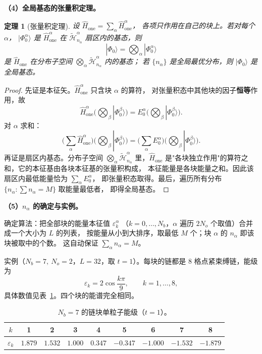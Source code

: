 \documentclass[11pt]{ctexart}
\newtheorem{thm}{定理}[section]
\begin{document}
\textbf{（4）全局基态的张量积定理。}

\begin{thm}[张量积定理]
设 $\hat H_{\mathrm{one}}=\sum_\alpha\hat H_{\mathrm{one}}^{\alpha}$，
各项只作用在自己的块上。若对每个 $\alpha$，
$|\Phi_0^{\alpha}\rangle$ 是 $\hat H_{\mathrm{one}}^{\alpha}$ 在
$\tilde{\mathcal{H}}_{n_\alpha}^\alpha$ 扇区内的基态，则
\[
|\Phi_0\rangle=\bigotimes_\alpha|\Phi_0^{\alpha}\rangle
\]
是 $\hat H_{\mathrm{one}}$ 在分布子空间
$\bigotimes_\alpha\tilde{\mathcal{H}}_{n_\alpha}^\alpha$ 内的基态；
若 $\{n_\alpha\}$ 是全局最优分布，则 $|\Phi_0\rangle$ 是全局基态。
\end{thm}

\begin{proof}
先证是本征矢。$\hat H_{\mathrm{one}}^{\alpha}$ 只含块 $\alpha$ 的算符，
对张量积态中其他块的因子\textbf{恒等}作用，故
\[
\hat H_{\mathrm{one}}^{\alpha}\Big(\bigotimes_\beta|\Phi_0^{\beta}\rangle\Big)
=
E_0^{\alpha}\Big(\bigotimes_\beta|\Phi_0^{\beta}\rangle\Big).
\]
对 $\alpha$ 求和：
\[
\Big(\sum_\alpha\hat H_{\mathrm{one}}^{\alpha}\Big)
\Big(\bigotimes_\beta|\Phi_0^{\beta}\rangle\Big)
=
\Big(\sum_\alpha E_0^{\alpha}\Big)
\Big(\bigotimes_\beta|\Phi_0^{\beta}\rangle\Big).
\]
再证是扇区内基态。分布子空间 $\bigotimes_\alpha\tilde{\mathcal{H}}_{n_\alpha}^\alpha$
里，$\hat H_{\mathrm{one}}$ 是"各块独立作用"的算符之和，它的本征基由各块本征基的张量积构成，
本征能量是各块能量之和。因此该扇区内最低能量恰为 $\sum_\alpha E_0^{\alpha}$，
即张量积态取得。最后，遍历所有分布 $\{n_\alpha:\sum n_\alpha=M\}$ 取能量最低者，
即得全局基态。
\end{proof}

\textbf{（5）$n_\alpha$ 的确定与实例。}

确定算法：把全部块的能量本征值 $\varepsilon_k^{\alpha}$
（$k=0,\dots,N_b$，$\alpha$ 遍历 $2N_o$ 个取值）合并成一个大小为 $L$ 的列表，
按能量从小到大排序，取最低 $M$ 个；块 $\alpha$ 的 $n_\alpha$ 即该块被取中的个数。
这自动保证 $\sum_\alpha n_\alpha=M$。

实例（$N_b=7,\ N_o=2$，$L=32$，取 $t=1$）。每块的链都是 8 格点紧束缚链，能级为
\[
\varepsilon_k=2\cos\frac{k\pi}{9},\qquad k=1,\dots,8 ,
\]
具体数值见表~\ref{tab:levels}。四个块的能谱完全相同。

\begin{table}[h]
\centering
\begin{tabular}{ccccccccc}
\toprule
$k$ & 1 & 2 & 3 & 4 & 5 & 6 & 7 & 8\\
\midrule
$\varepsilon_k$ & $1.879$ & $1.532$ & $1.000$ & $0.347$ & $-0.347$ & $-1.000$ & $-1.532$ & $-1.879$\\
\bottomrule
\end{tabular}
\caption{$N_b=7$ 的链块单粒子能级（$t=1$）。}
\label{tab:levels}
\end{table}
\end{document}
